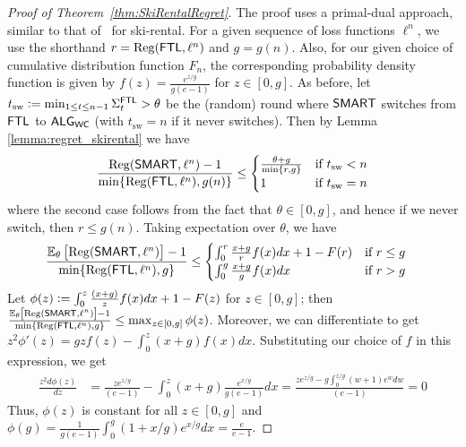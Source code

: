 \begin{proof}[Proof of Theorem~\ref{thm:SkiRentalRegret}]
The proof uses a primal-dual approach, similar to that of~\cite{karlin1994competitive} for ski-rental.
For a given sequence of loss functions $\ell^n$, we use the shorthand $r= \mathrm{Reg}(\mathsf{FTL},\ell^n)$ and $g=g(n)$.
Also, for our given choice of cumulative distribution function $F_n$, the corresponding probability density function is given by $f(z) = \frac{e^{z/g}}{g(e-1)}$ for $z\in[0,g]$. 
As before, let $t_{\mathrm{sw}} \mathrel{\mathop{:}}= \min_{1 \le t \le n-1} \Sigma^{\mathsf{FTL}}_t > \theta$ be the (random) round where $\mathsf{SMART}$ switches from $\mathsf{FTL}$ to $\mathsf{ALG}_{\mathsf{WC}}$ (with $t_{\mathrm{sw}}=n$ if it never switches). Then by Lemma \ref{lemma:regret_skirental} we have
\begin{align*}
\frac{\mathrm{Reg}(\mathsf{SMART},\ell^n) -1}{\min\{\mathrm{Reg}(\mathsf{FTL},\ell^n),g(n)\}}\leq \begin{cases} 
   \frac{\theta + g}{\min\{r,g\}} & \text{if } t_{\mathrm{sw}} < n \\
   1       & \text{if } t_{\mathrm{sw}} = n
  \end{cases}
\end{align*}
where the second case follows from the fact that $\theta\in[0,g]$, and hence if we never switch, then $r\le g(n)$. 
Taking expectation over $\theta$, we have
\begin{align*}
&\frac{\operatorname{\mathbb{E}}_{\theta}\left[\mathrm{Reg}(\mathsf{SMART},\ell^n)\right]-1}{\min\{\mathrm{Reg}(\mathsf{FTL},\ell^n),g\}}
\le 
\begin{cases} 
   \int_0^r   \frac{x + g}{r}f(x)dx + 1 - F(r)  & \text{if } r \le g \\
   \int_0^g   \frac{x + g}{g}f(x)dx        & \text{if } r > g
  \end{cases}
\end{align*}
Let $\phi(z) \mathrel{\mathop{:}}=  \int_0^z \frac{(x + g)}{z}f(x)dx + 1 - F(z) $ for $z\in[0,g]$; then $\frac{\operatorname{\mathbb{E}}_{\theta}\left[\mathrm{Reg}(\mathsf{SMART},\ell^n)\right]-1}{\min\{\mathrm{Reg}(\mathsf{FTL},\ell^n),g\}} \leq \max_{z\in[0,g]}\phi(z)$. Moreover, we can differentiate to get $z^2\phi'(z)= gzf(z) - \int_0^z(x + g)f(x)dx$. Substituting our choice of $f$ in this expression, we get
\begin{align*}
\frac{z^2d\phi(z)}{dz} &= \frac{ze^{z/g}}{(e-1)} - \int_0^z(x + g)\frac{e^{x/g}}{g(e-1)}dx
=\frac{ze^{z/g} - g\int_0^{z/g}(w + 1)e^{w}dw}{(e-1)}=0
\end{align*}
Thus, $\phi(z)$ is constant for all $z\in[0,g]$ and $\phi(g) = \frac{1}{g(e-1)}\int_0^g(1+x/g)e^{x/g}dx = \frac{e}{e-1}$. 
\end{proof}

